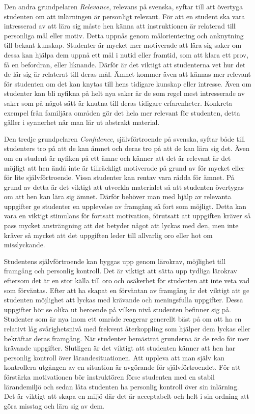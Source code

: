 \documentclass[12pt,a4paper,twoside,openright]{article}
\begin{document}
Den andra grundpelaren \textit{Relevance}, relevans på svenska, syftar
till att övertyga studenten om att inlärningen är personligt relevant.
För att en student ska vara intresserad av att lära sig måste hen
känna att instruktionen är relaterad till personliga mål eller motiv.
Detta uppnås genom målorientering och anknytning till bekant kunskap.
Studenter är mycket mer motiverade att lära sig saker om dessa kan
hjälpa dem uppnå ett mål i nutid eller framtid, som att klara ett
prov, få en befordran, eller liknande. Därför är det viktigt att
studenterna vet hur det de lär sig är relaterat till deras mål. Ämnet
kommer även att kännas mer relevant för studenten om det kan knytas
till hens tidigare kunskap eller intresse. Även om studenter kan bli
nyfikna på helt nya saker är de som regel mest intresserade av saker
som på något sätt är knutna till deras tidigare erfarenheter.
Konkreta exempel från familjära områden gör det hela mer relevant för
studenten, detta gäller i synnerhet när man lär ut abstrakt material.

Den tredje grundpelaren \textit{Confidence}, självförtroende på
svenska, syftar både till studenters tro på att de kan ämnet och deras
tro på att de kan lära sig det. Även om en student är nyfiken på ett
ämne och känner att det är relevant är det möjligt att hen ändå inte
är tillräckligt motiverade på grund av för mycket eller för lite
självförtroende. Vissa studenter kan rentav vara rädda för ämnet. På
grund av detta är det viktigt att utveckla materialet så att studenten
övertygas om att hen kan lära sig ämnet. Därför behöver man med hjälp
av relevanta uppgifter ge studenter en upplevelse av framgång så fort
som möjligt. Detta kan vara en viktigt stimulans för fortsatt
motivation, förutsatt att uppgiften kräver så pass mycket ansträngning
att det betyder något att lyckas med den, men inte kräver så mycket
att det uppgiften leder till allvarlig oro eller hot om misslyckande.

Studentens självförtroende kan byggas upp genom lärokrav, möjlighet
till fram\-gång och personlig kontroll. Det är viktigt att sätta upp
tydliga lärokrav eftersom det är en stor källa till oro och osäkerhet
för studenten att inte veta vad som förväntas. Efter att ha
skapat en förväntan av framgång är det viktigt att ge studenten
möjlighet att lyckas med krävande och meningsfulla uppgifter. Dessa
uppgifter bör se olika ut beroende på vilken nivå studenten befinner
sig på. Studenter som är nya inom ett område reagerar generellt bäst
på om att ha en relativt låg svårighetsnivå med frekvent återkoppling
som hjälper dem lyckas eller bekräftar deras framgång. När studenter
bemästrat grunderna är de redo för mer krävande uppgifter. Slutligen
är det viktigt att studenten känner att hen har personlig kontroll
över lärandesituationen. Att uppleva att man själv kan kontrollera
utgången av en situation är avgörande för självförtroendet. För att
förstärka motivationen bör instruktören förse studenten med en stabil
lärandemiljö och sedan låta studenten ha personlig kontroll över sin
inlärning. Det är viktigt att skapa en miljö där det är acceptabelt
och helt i sin ordning att göra misstag och lära sig av dem.
\end{document}
